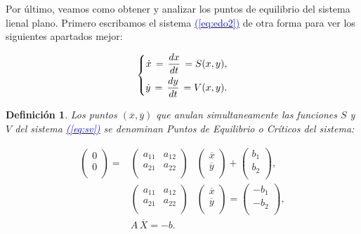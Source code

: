 \documentclass[12pt,a4paper]{report} %
\newtheorem{definicion}{Definición}[chapter]
\newtheorem{definicion}{Definición}[chapter] %
\newcommand{\eref}[1]{\hyperref[#1]{\textcolor{blue}{(\ref*{#1})}}}
\newcommand{\eref}[1]{\hyperref[#1]{\textcolor{blue}{\textit{(\ref*{#1})}}}}
\begin{document}
	
	\vspace{0.5cm}Por último, veamos como obtener y analizar los puntos de equilibrio del sistema lienal plano. Primero escribamos el sistema \eref{eq:edo2} de otra forma para ver los siguientes apartados mejor:
	
	\begin{equation}
		\label{eq:sv}
		\scalebox{1}{$\displaystyle
			\left\{
			\begin{aligned}
				\dot{x}\,=\,\frac{dx}{dt}\,=S(x,y), \\
				\dot{y}\,=\,\frac{dy}{dt}\,=V(x,y).
			\end{aligned}
			\right.
			$}
	\end{equation}\smallskip
	
	\begin{definicion}
		Los puntos $(\overline{x},\overline{y})$ que anulan simultaneamente las funciones $S$ y $V$ del sistema \eref{eq:sv} se denominan Puntos de Equilibrio o Críticos del sistema:
	\end{definicion}

	\begin{eqnarray}
		\label{eq:crit}
			\begin{pmatrix}
				0\\
				0\\
			\end{pmatrix} =
			&\begin{pmatrix}
				a_{11} & a_{12}\\
				a_{21} & a_{22}\\
			\end{pmatrix}&
			\begin{pmatrix}
				\overline{x}\\
				\overline{y}\\
			\end{pmatrix} + 
			\begin{pmatrix}
				b_1\\
				b_2\\
			\end{pmatrix},\nonumber \\[4mm]
			&\begin{pmatrix}
			a_{11} & a_{12}\\
			a_{21} & a_{22}\\
			\end{pmatrix}&
			\begin{pmatrix}
			\overline{x}\\
			\overline{y}\\
			\end{pmatrix} = 
			\begin{pmatrix}
			-b_1\\
			-b_2\\
			\end{pmatrix}, \nonumber \\[4mm]
			&A\,\overline{X}=-b.
	\end{eqnarray}\smallskip
	
\end{document}
